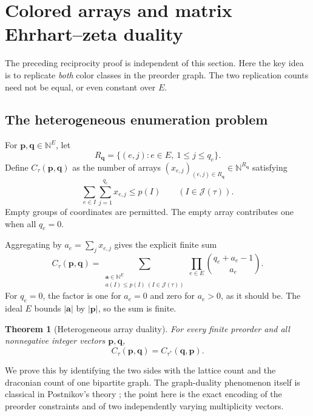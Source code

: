\documentclass[11pt,letterpaper]{article}
\newtheorem{theorem}{Theorem}[section]
\theoremstyle{definition}
\newcommand{\N}{\mathbb N}
\newcommand{\pvec}{\mathbf p}
\newcommand{\qvec}{\mathbf q}
\newcommand{\avec}{\mathbf a}
\newcommand{\JJ}{\mathcal J}
\newcommand{\sumv}[1]{\lvert #1\rvert}
\begin{document}
\section{Colored arrays and matrix Ehrhart--zeta duality}\label{sec:matrix}

The preceding reciprocity proof is independent of this section. Here the
key idea is to replicate \emph{both} color classes in the preorder graph.
The two replication counts need not be equal, or even constant over $E$.

\subsection{The heterogeneous enumeration problem}
For $\pvec,\qvec\in\N^E$, let
\[
 R_{\qvec}=\{(e,j):e\in E,\ 1\leq j\leq q_e\}.
\]
Define $C_\tau(\pvec,\qvec)$ as the number of arrays
$(x_{e,j})_{(e,j)\in R_{\qvec}}\in\N^{R_{\qvec}}$ satisfying
\begin{equation}\label{eq:colored-constraints}
 \sum_{e\in I}\sum_{j=1}^{q_e}x_{e,j}\leq p(I)
 \qquad(I\in\JJ(\tau)).
\end{equation}
Empty groups of coordinates are permitted. The empty array contributes one
when all $q_e=0$.

Aggregating by $a_e=\sum_jx_{e,j}$ gives the explicit finite sum
\begin{equation}\label{eq:colored-sum}
 C_\tau(\pvec,\qvec)=
 \sum_{\substack{\avec\in\N^E\\a(I)\leq p(I)\ (I\in\JJ(\tau))}}
             \prod_{e\in E}\binom{q_e+a_e-1}{a_e}.
\end{equation}
For $q_e=0$, the factor is one for $a_e=0$ and zero for $a_e>0$, as it
should be. The ideal $E$ bounds $\sumv{\avec}$ by $\sumv{\pvec}$, so the
sum is finite.

\begin{theorem}[Heterogeneous array duality]\label{thm:colored}
For every finite preorder and all nonnegative integer vectors
$\pvec,\qvec$,
\begin{equation}\label{eq:colored-duality}
 \boxed{C_\tau(\pvec,\qvec)=C_{\tau^*}(\qvec,\pvec).}
\end{equation}
\end{theorem}
We prove this by identifying the two sides with the lattice count and the
draconian count of one bipartite graph. The graph-duality phenomenon itself
is classical in Postnikov's theory \cite[Corollary~11.8]{Postnikov09}; the
point here is the exact encoding of the preorder constraints and of two
independently varying multiplicity vectors.
\end{document}
